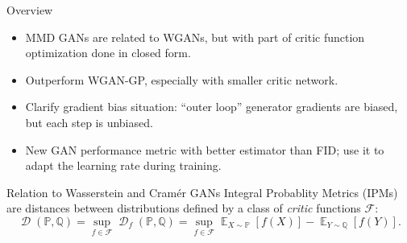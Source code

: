 \documentclass[xcolor={table}]{beamer}
\DeclareMathOperator{\D}{\mathcal{D}}
\DeclareMathOperator*{\E}{\mathbb{E}}
\newcommand{\F}{\mathcal{F}}
\newcommand{\PP}{\mathbb P}
\newcommand{\QQ}{\mathbb Q}
\begin{document}
\begin{frame}{}
\maketitle
\begin{columns}[T, totalwidth=\textwidth]

  \begin{column}{.32\textwidth}
    \begin{alertblock}{Overview}
      \begin{itemize}\raggedright
        \item MMD GANs are related to WGANs, but with part of critic function optimization done in closed form.
        \item Outperform WGAN-GP, especially with smaller critic network.
        \item Clarify gradient bias situation:
              ``outer loop'' generator gradients are biased,
              but each step is unbiased.
        \item New GAN performance metric with better estimator than FID;
              use it to adapt the learning rate during training.
      \end{itemize}
    \end{alertblock}
    \begin{block}{Relation to Wasserstein and Cram\'er GANs} 
      Integral Probablity Metrics (IPMs) %
      are distances between distributions
      defined by a class of \emph{critic} functions $\F$:
      \[
        \D(\PP, \QQ)
        = \sup_{f \in \F} \D_f(\PP, \QQ)
        = \sup_{f\in\F} \E_{X\sim\PP}[f(X)] - \E_{Y\sim\QQ}[f(Y)].
      \]


\end{block}
\end{column}
\end{columns}
\end{frame}
\end{document}
